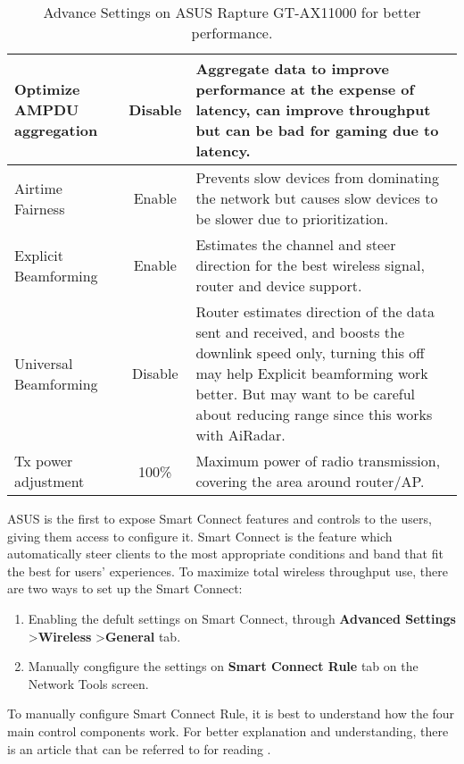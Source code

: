 \begin{table}[ht]
\begin{tabular}{|p{3cm}|c|p{8cm}|}
    \hline
    Optimize AMPDU aggregation & Disable & Aggregate data to improve performance at the expense of latency, can improve throughput but can be bad for gaming due to latency. \\
    \hline
    Airtime Fairness & Enable & Prevents slow devices from dominating the network but causes slow devices to be slower due to prioritization. \\
    \hline
    Explicit Beamforming & Enable & Estimates the channel and steer direction for the best wireless signal, router and device support. \\
    \hline
    Universal Beamforming & Disable & Router estimates direction of the data sent and received, and boosts the downlink speed only, turning this off may help Explicit beamforming work better. But may want to be careful about reducing range since this works with AiRadar. \\
    \hline
    Tx power adjustment & 100\% & Maximum power of radio transmission, covering the area around router/AP. \\ 
    \hline
    
    \end{tabular}
    \caption{Advance Settings on ASUS Rapture GT-AX11000 for better performance.}
    \label{tab:router_configuration}
\end{table}

ASUS is the first to expose Smart Connect features and controls to the users, giving them access to configure it. Smart Connect is the feature which automatically steer clients to the most appropriate conditions and band that fit the best for users’ experiences. To maximize total wireless throughput use, there are two ways to set up the Smart Connect:
\begin{enumerate}
    \item Enabling the defult settings on Smart Connect, through \textbf{Advanced Settings} \textgreater \textbf{Wireless} \textgreater \textbf{General} tab.
    \item Manually congfigure the settings on \textbf{Smart Connect Rule} tab on the Network Tools screen.
\end{enumerate}

To manually configure Smart Connect Rule, it is best to understand how the four main control components work. For better explanation and understanding, there is an article that can be referred to for reading \cite{higgins_2015}.